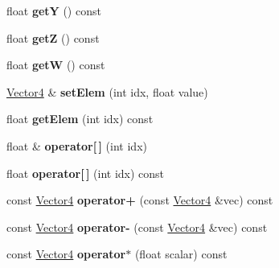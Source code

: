 \begin{DoxyCompactItemize}
float {\bfseries getY} () const
\item 
\mbox{\label{classVectormath_1_1Aos_1_1Vector4_a45ee46ca0fe52e0b19935fd3fa264951}} 
float {\bfseries getZ} () const
\item 
\mbox{\label{classVectormath_1_1Aos_1_1Vector4_a7f63ff20e6a8125b23090f3e9bd502bb}} 
float {\bfseries getW} () const
\item 
\mbox{\label{classVectormath_1_1Aos_1_1Vector4_a276e3e1533678028233cb3d3c28e8614}} 
\hyperlink{classVectormath_1_1Aos_1_1Vector4}{Vector4} \& {\bfseries set\+Elem} (int idx, float value)
\item 
\mbox{\label{classVectormath_1_1Aos_1_1Vector4_a2b57b84ded5d12fb7531973bb1a88abc}} 
float {\bfseries get\+Elem} (int idx) const
\item 
\mbox{\label{classVectormath_1_1Aos_1_1Vector4_af17b2f536750a2cbbef96c855ef43eda}} 
float \& {\bfseries operator\mbox{[}$\,$\mbox{]}} (int idx)
\item 
\mbox{\label{classVectormath_1_1Aos_1_1Vector4_a19518806cfe69127b9abcf71c02610b0}} 
float {\bfseries operator\mbox{[}$\,$\mbox{]}} (int idx) const
\item 
\mbox{\label{classVectormath_1_1Aos_1_1Vector4_ad9a9cb586efff8d00403a97562e7cda9}} 
const \hyperlink{classVectormath_1_1Aos_1_1Vector4}{Vector4} {\bfseries operator+} (const \hyperlink{classVectormath_1_1Aos_1_1Vector4}{Vector4} \&vec) const
\item 
\mbox{\label{classVectormath_1_1Aos_1_1Vector4_a70627bff0b5d5c80dad2e3d9117779cf}} 
const \hyperlink{classVectormath_1_1Aos_1_1Vector4}{Vector4} {\bfseries operator-\/} (const \hyperlink{classVectormath_1_1Aos_1_1Vector4}{Vector4} \&vec) const
\item 
\mbox{\label{classVectormath_1_1Aos_1_1Vector4_a24a69ae05a7f0c96e13c5c0a27030b3a}} 
const \hyperlink{classVectormath_1_1Aos_1_1Vector4}{Vector4} {\bfseries operator$\ast$} (float scalar) const

\end{DoxyCompactItemize}
